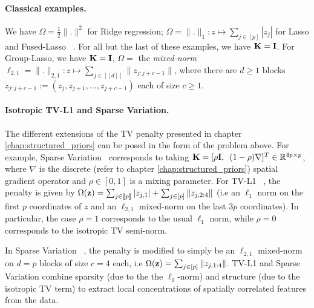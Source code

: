 \paragraph*{Classical examples.}
We have $\Omega = \frac{1}{2}\|.\|^2$ for Ridge regression;
$\Omega = \|.\|_1: z \mapsto \sum_{j \in [p]}|z_j|$
for Lasso and Fused-Lasso ~\citep{Tibshirani05}. For all but the last of
these examples, we have $\mathbf{K} = \mathbf{I}$. For Group-Lasso, we have $\mathbf{K}=\mathbf{I}$,
$\Omega = $ the \textit{mixed-norm} $\ell_{2,1}= \|.\|_{2,1}:z
\mapsto \sum_{j \in [\![d]\!]}\|z_{j:j+c-1}\|$, where there are $d \ge
1$ blocks $z_{j:j+c-1}:=(z_j, z_{j+1}, ..., z_{j+c-1})$ each of size $c \ge
1$. %
\label{sec:examples}

\paragraph*{Isotropic TV-L1 and Sparse Variation.}
The different extensions of the TV penalty presented in chapter \ref{chap:structured_priors} can be posed in the form of the problem above.
For example, Sparse Variation~\citep{eickenberg2015total} corresponds to taking
$\mathbf{K} = [\rho\mathbf{I},\hspace{.5em}(1-\rho)\nabla]^T \in
\mathbb{R}^{4p \times p}$, where $\nabla$ is the discrete
(refer to chapter \ref{chap:structured_priors}) spatial gradient operator
and $\rho \in [0, 1]$ is a mixing parameter.
For TV-L1 ~\citep{baldassarre2012,gramfort2013}, the penalty is
given by $\Omega(\mathbf{z}) = \sum_{j \in [\![p]\!]}|z_{j,1}| + \sum_{j \in
  [p]}\|z_{j,2:4}\|$ (i.e an $\ell_1$ norm on the first $p$
coordinates of $z$ and an $\ell_{2,1}$ mixed-norm on the last $3p$
coordinates). In particular, the case $\rho = 1$
corresponds to the usual $\ell_1$ norm, while $\rho = 0$ corresponds to
the isotropic TV semi-norm.

In Sparse Variation ~\citep{eickenberg2015total}, 
the penalty is modified to simply be an $\ell_{2,1}$
mixed-norm on $d = p$ blocks of size $c = 4$ each, i.e
$\Omega(\mathbf{z}) = \sum_{j \in [p]}\|z_{j,1:4}\|$. 
TV-L1 and Sparse Variation combine sparsity (due to the
the $\ell_1$-norm) and structure (due to the isotropic TV term) to
extract local concentrations of spatially correlated features
from the data.%

